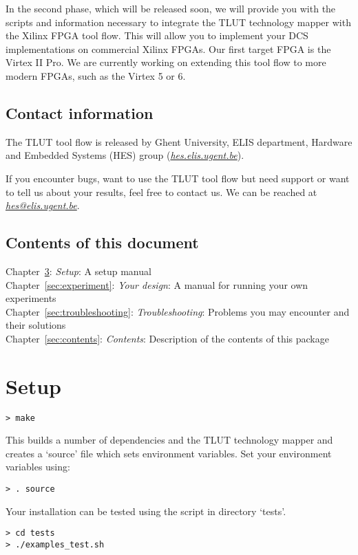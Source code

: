 \documentclass[a4paper,oneside]{memoir}
\begin{document}
In the second phase, which will be released soon, we will provide you with the scripts and information necessary to integrate the TLUT technology mapper with the Xilinx FPGA tool flow. This will allow you to implement your DCS implementations on commercial Xilinx FPGAs. Our first target FPGA is the Virtex II Pro. We are currently working on extending this tool flow to more modern FPGAs, such as the Virtex 5 or 6.

\section{Contact information}
The TLUT tool flow is released by Ghent University, ELIS department, Hardware and Embedded Systems (HES) group (\href{http://hes.elis.ugent.be}{\emph{hes.elis.ugent.be}}).

If you encounter bugs, want to use the TLUT tool flow but need support or want to tell us about your results, feel free to contact us.
We can be reached at \href{mailto:hes@elis.ugent.be}{\emph{hes@elis.ugent.be}}.


\section{Contents of this document}
Chapter~\ref{sec:setup}: \emph{Setup}: A setup manual\\
Chapter~\ref{sec:experiment}: \emph{Your design}: A manual for running your own experiments\\
Chapter~\ref{sec:troubleshooting}: \emph{Troubleshooting}: Problems you may encounter and their solutions\\
Chapter~\ref{sec:contents}: \emph{Contents}: Description of the contents of this package


\clearpage
\chapter{Setup}\label{sec:setup}
\begin{lstlisting}
> make
\end{lstlisting}
This builds a number of dependencies and the TLUT technology mapper and creates a `source' file which sets environment variables. Set your environment variables using:
\begin{lstlisting}
> . source
\end{lstlisting}

Your installation can be tested using the script in directory `tests'.
\begin{lstlisting}
> cd tests
> ./examples_test.sh
\end{lstlisting}
\end{document}
